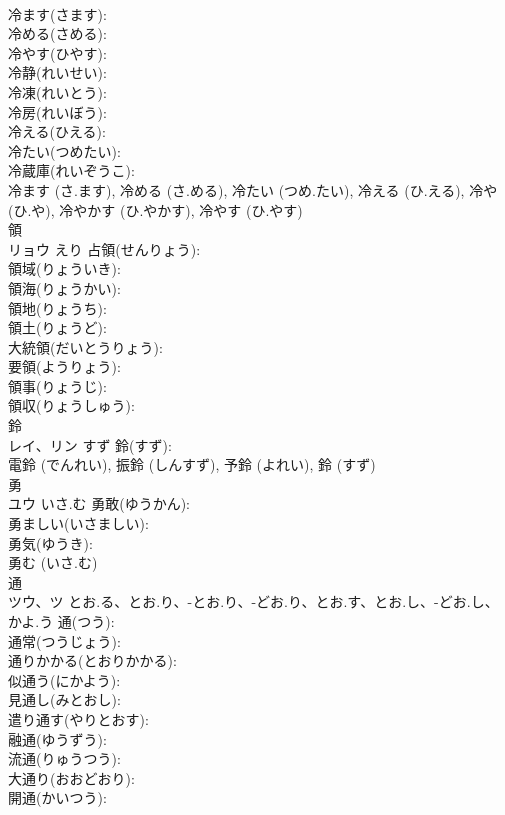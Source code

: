 \documentclass[8pt]{extreport}
\begin{document}
\begin{CJK}{UTF8}{min}
\\	冷ます(さます): 
\\	冷める(さめる): 
\\	冷やす(ひやす): 
\\	冷静(れいせい): 
\\	冷凍(れいとう): 
\\	冷房(れいぼう): 
\\	冷える(ひえる): 
\\	冷たい(つめたい): 
\\	冷蔵庫(れいぞうこ): 
\\	冷ます (さ.ます), 冷める (さ.める), 冷たい (つめ.たい), 冷える (ひ.える), 冷や (ひ.や), 冷やかす (ひ.やかす), 冷やす (ひ.やす)
\\	領			
\\	リョウ	えり	占領(せんりょう): 
\\	領域(りょういき): 
\\	領海(りょうかい): 
\\	領地(りょうち): 
\\	領土(りょうど): 
\\	大統領(だいとうりょう): 
\\	要領(ようりょう): 
\\	領事(りょうじ): 
\\	領収(りょうしゅう): 
\\	鈴			
\\	レイ、リン	すず	鈴(すず): 
\\	電鈴 (でんれい), 振鈴 (しんすず), 予鈴 (よれい), 鈴 (すず)
\\	勇			
\\	ユウ	いさ.む	勇敢(ゆうかん): 
\\	勇ましい(いさましい): 
\\	勇気(ゆうき): 
\\	勇む (いさ.む)
\\	通			
\\	ツウ、ツ	とお.る、とお.り、-とお.り、-どお.り、とお.す、とお.し、-どお.し、かよ.う	通(つう): 
\\	通常(つうじょう): 
\\	通りかかる(とおりかかる): 
\\	似通う(にかよう): 
\\	見通し(みとおし): 
\\	遣り通す(やりとおす): 
\\	融通(ゆうずう): 
\\	流通(りゅうつう): 
\\	大通り(おおどおり): 
\\	開通(かいつう): 

\end{CJK}
\end{document}

